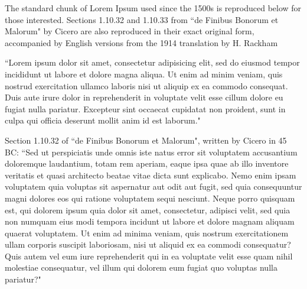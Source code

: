 The standard chunk of Lorem Ipsum used since the 1500s is reproduced below for those interested. Sections 1.10.32 and 1.10.33 from ``de Finibus Bonorum et Malorum" by Cicero are also reproduced in their exact original form, accompanied by English versions from the 1914 translation by H. Rackham

``Lorem ipsum dolor sit amet, consectetur adipisicing elit, sed do eiusmod tempor incididunt ut labore et dolore magna aliqua. Ut enim ad minim veniam, quis nostrud exercitation ullamco laboris nisi ut aliquip ex ea commodo consequat. Duis aute irure dolor in reprehenderit in voluptate velit esse cillum dolore eu fugiat nulla pariatur. Excepteur sint occaecat cupidatat non proident, sunt in culpa qui officia deserunt mollit anim id est laborum."

Section 1.10.32 of ``de Finibus Bonorum et Malorum", written by Cicero in 45 BC: ``Sed ut perspiciatis unde omnis iste natus error sit voluptatem accusantium doloremque laudantium, totam rem aperiam, eaque ipsa quae ab illo inventore veritatis et quasi architecto beatae vitae dicta sunt explicabo. Nemo enim ipsam voluptatem quia voluptas sit aspernatur aut odit aut fugit, sed quia consequuntur magni dolores eos qui ratione voluptatem sequi nesciunt. Neque porro quisquam est, qui dolorem ipsum quia dolor sit amet, consectetur, adipisci velit, sed quia non numquam eius modi tempora incidunt ut labore et dolore magnam aliquam quaerat voluptatem. Ut enim ad minima veniam, quis nostrum exercitationem ullam corporis suscipit laboriosam, nisi ut aliquid ex ea commodi consequatur? Quis autem vel eum iure reprehenderit qui in ea voluptate velit esse quam nihil molestiae consequatur, vel illum qui dolorem eum fugiat quo voluptas nulla pariatur?"



